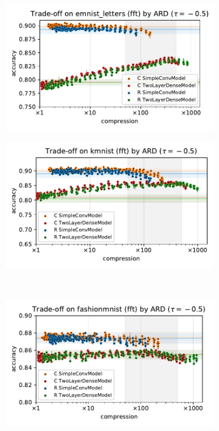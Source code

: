 \documentclass[a4paper,10pt,onecolumn]{article}
\begin{document}
\begin{figure}[b]
  \centering
  \begin{subfigure}[b]{0.5\columnwidth}
    \centering
    \includegraphics[width=\linewidth]{figure__mnist-like__trade-off/appendix__ARD__emnist_letters__fft__-0.5.pdf}
  \end{subfigure}%
  \begin{subfigure}[b]{0.5\columnwidth}
    \centering
    \includegraphics[width=\linewidth]{figure__mnist-like__trade-off/appendix__ARD__kmnist__fft__-0.5.pdf}
  \end{subfigure} \\ %
  \begin{subfigure}[b]{0.5\columnwidth}
    \centering
    \includegraphics[width=\linewidth]{figure__mnist-like__trade-off/appendix__ARD__fashionmnist__fft__-0.5.pdf}

\end{subfigure}
\end{figure}
\end{document}
